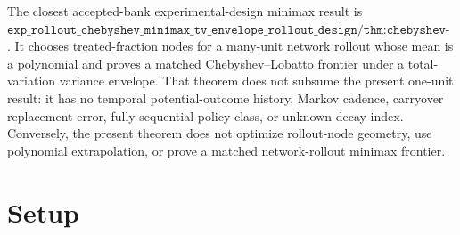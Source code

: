 \documentclass{article}
\begin{document}
The closest accepted-bank experimental-design minimax result is \(\texttt{exp\_rollout\_chebyshev\_minimax\_tv\_envelope\_rollout\_design/thm:chebyshev-minimax}\). It chooses treated-fraction nodes for a many-unit network rollout whose mean is a polynomial and proves a matched Chebyshev--Lobatto frontier under a total-variation variance envelope. That theorem does not subsume the present one-unit result: it has no temporal potential-outcome history, Markov cadence, carryover replacement error, fully sequential policy class, or unknown decay index. Conversely, the present theorem does not optimize rollout-node geometry, use polynomial extrapolation, or prove a matched network-rollout minimax frontier.

\section{Setup}
\end{document}
